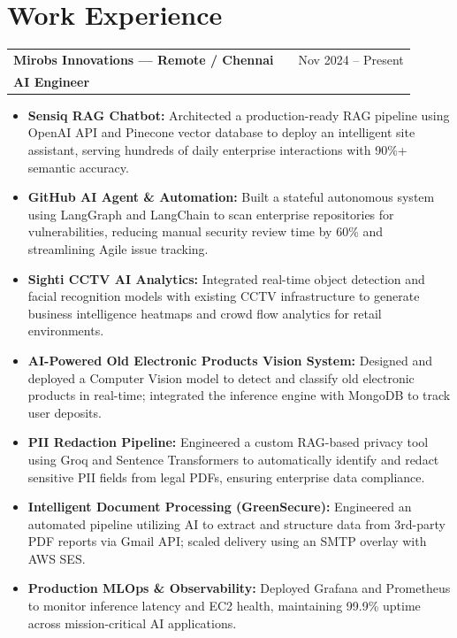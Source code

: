 \documentclass[a4paper,10pt]{article}
\begin{document}
\section{Work Experience}
\begin{tabularx}{\linewidth}{ @{}l X r@{} }
\textbf{Mirobs Innovations --- Remote / Chennai} & & \hfill \color[HTML]{371e77} Nov 2024 -- Present \\
\color[HTML]{371e77}\textbf{AI Engineer} & & \\
\end{tabularx}
\begin{itemize}[nosep, leftmargin=2em]
\item \textbf{Sensiq RAG Chatbot:} Architected a production-ready RAG pipeline using OpenAI API and Pinecone vector database to deploy an intelligent site assistant, serving hundreds of daily enterprise interactions with 90\%+ semantic accuracy.
\item \textbf{GitHub AI Agent \& Automation:} Built a stateful autonomous system using LangGraph and LangChain to scan enterprise repositories for vulnerabilities, reducing manual security review time by 60\% and streamlining Agile issue tracking.
\item \textbf{Sighti CCTV AI Analytics:} Integrated real-time object detection and facial recognition models with existing CCTV infrastructure to generate business intelligence heatmaps and crowd flow analytics for retail environments.
\item \textbf{AI-Powered Old Electronic Products Vision System:} Designed and deployed a Computer Vision model to detect and classify old electronic products in real-time; integrated the inference engine with MongoDB to track user deposits.
\item \textbf{PII Redaction Pipeline:} Engineered a custom RAG-based privacy tool using Groq and Sentence Transformers to automatically identify and redact sensitive PII fields from legal PDFs, ensuring enterprise data compliance.
\item \textbf{Intelligent Document Processing (GreenSecure):} Engineered an automated pipeline utilizing AI to extract and structure data from 3rd-party PDF reports via Gmail API; scaled delivery using an SMTP overlay with AWS SES.
\item \textbf{Production MLOps \& Observability:} Deployed Grafana and Prometheus to monitor inference latency and EC2 health, maintaining 99.9\% uptime across mission-critical AI applications.
\end{itemize}
\end{document}
